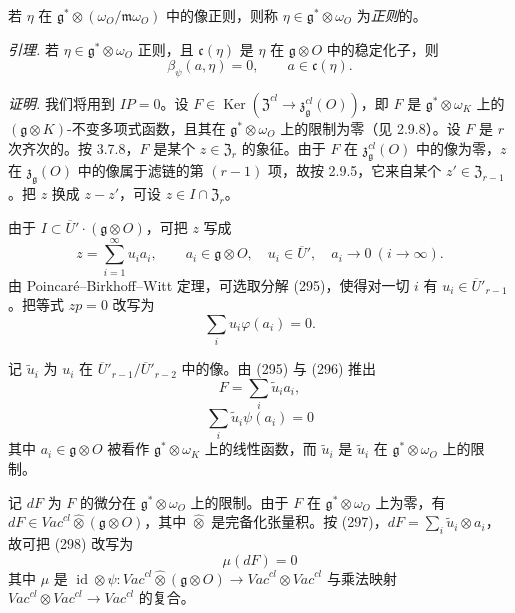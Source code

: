 若 $\eta$ 在 $\mathfrak{g}^*\otimes(\omega_O/\mathfrak{m}\omega_O)$ 中的像正则，则称 $\eta\in\mathfrak{g}^*\otimes\omega_O$ 为\emph{正则}的。

\emph{引理.} 若 $\eta\in\mathfrak{g}^*\otimes\omega_O$ 正则，且 $\mathfrak{c}(\eta)$ 是 $\eta$ 在 $\mathfrak{g}\otimes O$ 中的稳定化子，则
\begin{equation}\tag{294}
\beta_\psi(a,\eta)=0,\qquad a\in\mathfrak{c}(\eta).
\end{equation}

\emph{证明.} 我们将用到 $IP=0$。设 $F\in\operatorname{Ker}(\mathfrak{Z}^{cl}\to\mathfrak{z}^{cl}_{\mathfrak{g}}(O))$，即 $F$ 是 $\mathfrak{g}^*\otimes\omega_K$ 上的 $(\mathfrak{g}\otimes K)$-不变多项式函数，且其在 $\mathfrak{g}^*\otimes\omega_O$ 上的限制为零（见 2.9.8）。设 $F$ 是 $r$ 次齐次的。按 3.7.8，$F$ 是某个 $z\in\mathfrak{Z}_r$ 的象征。由于 $F$ 在 $\mathfrak{z}^{cl}_{\mathfrak{g}}(O)$ 中的像为零，$z$ 在 $\mathfrak{z}_{\mathfrak{g}}(O)$ 中的像属于滤链的第 $(r-1)$ 项，故按 2.9.5，它来自某个 $z'\in\mathfrak{Z}_{r-1}$。把 $z$ 换成 $z-z'$，可设 $z\in I\cap\mathfrak{Z}_r$。

由于 $I\subset\overline{U}'\cdot(\mathfrak{g}\otimes O)$，可把 $z$ 写成
\begin{equation}\tag{295}
z=\sum_{i=1}^{\infty}u_ia_i,\qquad a_i\in\mathfrak{g}\otimes O,\quad u_i\in\overline{U}',\quad a_i\to 0\ (i\to\infty).
\end{equation}
由 Poincaré--Birkhoff--Witt 定理，可选取分解 (295)，使得对一切 $i$ 有 $u_i\in\overline{U}'_{r-1}$。把等式 $zp=0$ 改写为
\begin{equation}\tag{296}
\sum_i u_i\varphi(a_i)=0.
\end{equation}


记 $\tilde u_i$ 为 $u_i$ 在 $\overline{U}'_{r-1}/\overline{U}'_{r-2}$ 中的像。由 (295) 与 (296) 推出
\begin{equation}\tag{297}
F=\sum_i\tilde u_ia_i,
\end{equation}
\begin{equation}\tag{298}
\sum_i\tilde u_i\psi(a_i)=0
\end{equation}
其中 $a_i\in\mathfrak{g}\otimes O$ 被看作 $\mathfrak{g}^*\otimes\omega_K$ 上的线性函数，而 $\tilde u_i$ 是 $\tilde u_i$ 在 $\mathfrak{g}^*\otimes\omega_O$ 上的限制。

记 $dF$ 为 $F$ 的微分在 $\mathfrak{g}^*\otimes\omega_O$ 上的限制。由于 $F$ 在 $\mathfrak{g}^*\otimes\omega_O$ 上为零，有 $dF\in\mathit{Vac}^{cl}\widehat{\otimes}(\mathfrak{g}\otimes O)$，其中 $\widehat{\otimes}$ 是完备化张量积。按 (297)，$dF=\sum_i\tilde u_i\otimes a_i$，故可把 (298) 改写为
\begin{equation}\tag{299}
\mu(dF)=0
\end{equation}
其中 $\mu$ 是 $\operatorname{id}\otimes\psi:\mathit{Vac}^{cl}\widehat{\otimes}(\mathfrak{g}\otimes O)\to\mathit{Vac}^{cl}\otimes\mathit{Vac}^{cl}$ 与乘法映射 $\mathit{Vac}^{cl}\otimes\mathit{Vac}^{cl}\to\mathit{Vac}^{cl}$ 的复合。

